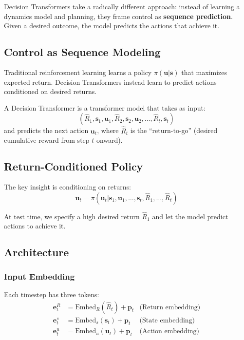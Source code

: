 Decision Transformers take a radically different approach: instead of learning a dynamics model and planning, they frame control as \textbf{sequence prediction}. Given a desired outcome, the model predicts the actions that achieve it.

\subsection{Control as Sequence Modeling}

Traditional reinforcement learning learns a policy $\pi(\mathbf{u} | \mathbf{s})$ that maximizes expected return. Decision Transformers instead learn to predict actions conditioned on desired returns.

\begin{definition}
A Decision Transformer is a transformer model that takes as input:
\begin{equation}
(\hat{R}_1, \mathbf{s}_1, \mathbf{u}_1, \hat{R}_2, \mathbf{s}_2, \mathbf{u}_2, \ldots, \hat{R}_t, \mathbf{s}_t)
\end{equation}
and predicts the next action $\mathbf{u}_t$, where $\hat{R}_t$ is the ``return-to-go'' (desired cumulative reward from step $t$ onward).
\end{definition}

\subsection{Return-Conditioned Policy}

The key insight is conditioning on returns:
\begin{equation}
\mathbf{u}_t = \pi(\mathbf{u}_t | \mathbf{s}_1, \mathbf{u}_1, \ldots, \mathbf{s}_t, \hat{R}_1, \ldots, \hat{R}_t)
\end{equation}

At test time, we specify a high desired return $\hat{R}_1$ and let the model predict actions to achieve it.

\subsection{Architecture}

\subsubsection{Input Embedding}

Each timestep has three tokens:
\begin{align}
\mathbf{e}_t^R &= \text{Embed}_R(\hat{R}_t) + \mathbf{p}_t & \text{(Return embedding)} \\
\mathbf{e}_t^s &= \text{Embed}_s(\mathbf{s}_t) + \mathbf{p}_t & \text{(State embedding)} \\
\mathbf{e}_t^u &= \text{Embed}_u(\mathbf{u}_t) + \mathbf{p}_t & \text{(Action embedding)}
\end{align}

